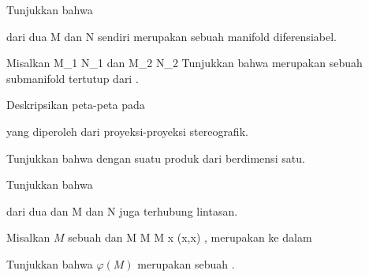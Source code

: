 \setcounter{section}{11}


{}
{

Tunjukkan bahwa

 dari dua
\mathkor {} {M} {dan} {N} {}
sendiri merupakan sebuah manifold diferensiabel.

}
{} {}

{}
{

Misalkan
\mathkor {} {M_1 \subseteq N_1} {dan} {M_2 \subseteq N_2} {}
 Tunjukkan bahwa
 merupakan sebuah submanifold tertutup dari
.

}
{} {}

{}
{

Deskripsikan peta-peta pada

 yang diperoleh dari proyeksi-proyeksi stereografik.

}
{} {}

{}
{

Tunjukkan bahwa
dengan suatu produk dari
berdimensi satu.

}
{} {}

{}
{

Tunjukkan bahwa

 dari dua
 dan
\mathkor {} {M} {dan} {N} {}
juga terhubung lintasan.

}
{} {}

{}
{

Misalkan $M$ sebuah
dan
\maabbeledisp {\varphi} { M } { M \times M
} { x } {(x,x)
} {,}
merupakan
ke dalam

 Tunjukkan bahwa
$\varphi(M)$ merupakan sebuah
.

}
{} {}

